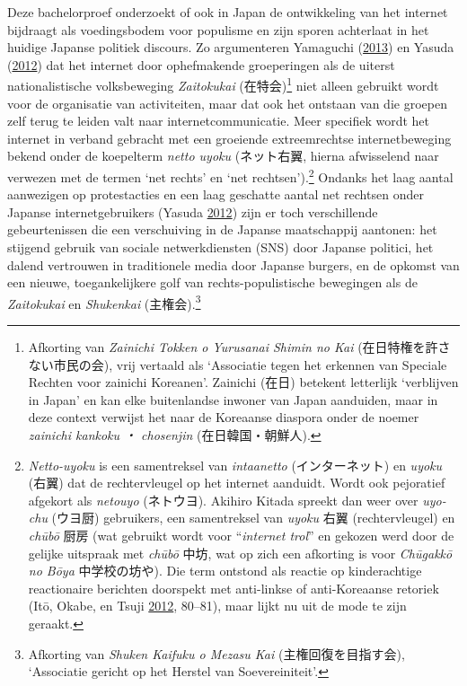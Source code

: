 \documentclass[10.5pt,dutch,]{article}
\begin{document}
Deze bachelorproef onderzoekt of ook in Japan de ontwikkeling van het
internet bijdraagt als voedingsbodem voor populisme en zijn sporen
achterlaat in het huidige Japanse politiek discours. Zo argumenteren
Yamaguchi
(\protect\hyperlink{ref-yamaguchiux5fxenophobiaux5f2013}{2013}) en
Yasuda (\protect\hyperlink{ref-yasudaux5fnettoux5f2012}{2012}) dat het
internet door ophefmakende groeperingen als de uiterst nationalistische
volksbeweging \emph{Zaitokukai} (在特会)\footnote{Afkorting van
  \emph{Zainichi Tokken o Yurusanai Shimin no Kai}
  (在日特権を許さない市民の会), vrij vertaald als `Associatie tegen het
  erkennen van Speciale Rechten voor zainichi Koreanen'. Zainichi (在日)
  betekent letterlijk `verblijven in Japan' en kan elke buitenlandse
  inwoner van Japan aanduiden, maar in deze context verwijst het naar de
  Koreaanse diaspora onder de noemer \emph{zainichi kankoku ・
  chosenjin} (在日韓国・朝鮮人).} niet alleen gebruikt wordt voor de
organisatie van activiteiten, maar dat ook het ontstaan van die groepen
zelf terug te leiden valt naar internetcommunicatie. Meer specifiek
wordt het internet in verband gebracht met een groeiende extreemrechtse
internetbeweging bekend onder de koepelterm \emph{netto uyoku}
(ネット右翼, hierna afwisselend naar verwezen met de termen `net rechts'
en `net rechtsen').\footnote{\emph{Netto-uyoku} is een samentreksel van
  \emph{intaanetto} (インターネット) en \emph{uyoku} (右翼) dat de
  rechtervleugel op het internet aanduidt. Wordt ook pejoratief afgekort
  als \emph{netouyo} (ネトウヨ). Akihiro Kitada spreekt dan weer over
  \emph{uyo-chu} (ウヨ厨) gebruikers, een samentreksel van \emph{uyoku}
  右翼 (rechtervleugel) en \emph{chūbō} 厨房 (wat gebruikt wordt voor
  ``\emph{internet trol}'' en gekozen werd door de gelijke uitspraak met
  \emph{chūbō} 中坊, wat op zich een afkorting is voor \emph{Chūgakkō no
  Bōya} 中学校の坊や). Die term ontstond als reactie op kinderachtige
  reactionaire berichten doorspekt met anti-linkse of anti-Koreaanse
  retoriek (Itō, Okabe, en Tsuji
  \protect\hyperlink{ref-itoux5ffandomux5f2012}{2012}, 80--81), maar
  lijkt nu uit de mode te zijn geraakt.} Ondanks het laag aantal
aanwezigen op protestacties en een laag geschatte aantal net rechtsen
onder Japanse internetgebruikers (Yasuda
\protect\hyperlink{ref-yasudaux5fnettoux5f2012}{2012}) zijn er toch
verschillende gebeurtenissen die een verschuiving in de Japanse
maatschappij aantonen: het stijgend gebruik van sociale netwerkdiensten
(SNS) door Japanse politici, het dalend vertrouwen in traditionele media
door Japanse burgers, en de opkomst van een nieuwe, toegankelijkere golf
van rechts-populistische bewegingen als de \emph{Zaitokukai} en
\emph{Shukenkai} (主権会).\footnote{Afkorting van \emph{Shuken Kaifuku o
  Mezasu Kai} (主権回復を目指す会), `Associatie gericht op het Herstel
  van Soevereiniteit'.}
\end{document}
